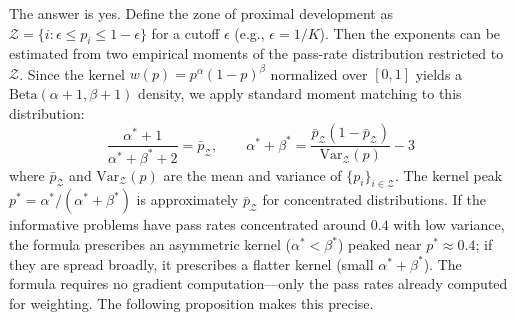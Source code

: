 \documentclass{article}
\begin{document}
The answer is yes. Define the zone of proximal development as $\mathcal{Z} = \{i : \epsilon \leq p_i \leq 1 - \epsilon\}$ for a cutoff $\epsilon$ (e.g., $\epsilon = 1/K$). Then the exponents can be estimated from two empirical moments of the pass-rate distribution restricted to $\mathcal{Z}$. Since the kernel $w(p)=p^\alpha(1-p)^\beta$ normalized over $[0,1]$ yields a $\mathrm{Beta}(\alpha{+}1,\beta{+}1)$ density, we apply standard moment matching to this distribution:
\begin{equation}
  \frac{\alpha^*+1}{\alpha^*+\beta^*+2} = \bar{p}_{\mathcal{Z}}, \qquad \alpha^* + \beta^* = \frac{\bar{p}_{\mathcal{Z}}(1 - \bar{p}_{\mathcal{Z}})}{\text{Var}_{\mathcal{Z}}(p)} - 3
  \label{eq:exponent_selection}
\end{equation}
where $\bar{p}_{\mathcal{Z}}$ and $\text{Var}_{\mathcal{Z}}(p)$ are the mean and variance of $\{p_i\}_{i \in \mathcal{Z}}$. The kernel peak $p^* = \alpha^*/(\alpha^*+\beta^*)$ is approximately $\bar{p}_{\mathcal{Z}}$ for concentrated distributions. If the informative problems have pass rates concentrated around $0.4$ with low variance, the formula prescribes an asymmetric kernel ($\alpha^* < \beta^*$) peaked near $p^* \approx 0.4$; if they are spread broadly, it prescribes a flatter kernel (small $\alpha^* + \beta^*$). The formula requires no gradient computation---only the pass rates already computed for weighting. The following proposition makes this precise.
\end{document}
